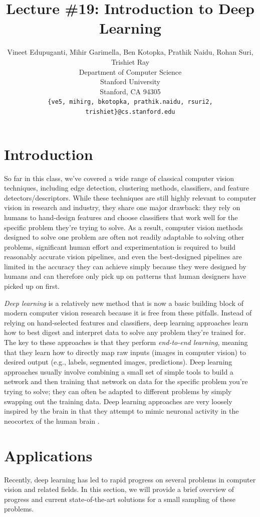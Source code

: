 ﻿\documentclass{article}
\title{Lecture \#19: Introduction to Deep Learning}
\author{
  Vineet Edupuganti, Mihir Garimella, Ben Kotopka, Prathik Naidu, Rohan Suri, Trishiet Ray \\
  Department of Computer Science\\
  Stanford University\\
  Stanford, CA 94305 \\
  \texttt{\{ve5, mihirg, bkotopka, prathik.naidu, rsuri2, trishiet\}@cs.stanford.edu} \\
}
\begin{document}
\maketitle

\section{Introduction}
So far in this class, we've covered a wide range of classical computer vision techniques, including edge detection, clustering methods, classifiers, and feature detectors/descriptors. While these  techniques are still highly relevant to computer vision in research and industry, they share one major drawback: they rely on humans to hand-design features and choose classifiers that work well for the specific problem they're trying to solve. As a result, computer vision methods designed to solve one problem are often not readily adaptable to solving other problems, significant human effort and experimentation is required to build reasonably accurate vision pipelines, and even the best-designed pipelines are limited in the accuracy they can achieve simply because they were designed by humans and can therefore only pick up on patterns that human designers have picked up on first.

\textit{Deep learning} is a relatively new method that is now a basic building block of modern computer vision research because it is free from these pitfalls. Instead of relying on hand-selected features and classifiers, deep learning approaches learn how to best digest and interpret data to solve any problem they're trained for. The key to these approaches is that they perform \textit{end-to-end learning}, meaning that they learn how to directly map raw inputs (images in computer vision) to desired output (e.g., labels, segmented images, predictions). Deep learning approaches usually involve combining a small set of simple tools to build a network and then training that network on data for the specific problem you're trying to solve; they can often be adapted to different problems by simply swapping out the training data. Deep learning approaches are very loosely inspired by the brain in that they attempt to mimic neuronal activity in the neocortex of the human brain \cite{hof_2016}.

\section{Applications}
Recently, deep learning has led to rapid progress on several problems in computer vision and related fields. In this section, we will provide a brief overview of progress and current state-of-the-art solutions for a small sampling of these problems.
\end{document}
